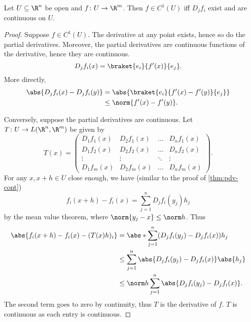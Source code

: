 \begin{proposition}
    Let $U \subseteq \R^n$ be open and $f\colon U \to \R^m$.
    Then $f \in C^1(U)$ iff $D_j f_i$ exist and are continuous on $U$.
\end{proposition}
\begin{proof}
    Suppose $f \in C^1(U)$.
    The derivative at any point exists, hence so do the partial derivatives.
    Moreover, the partial derivatives are continuous functions of the
    derivative, hence they are continuous. \[
        D_j f_i(x) = \braket{e_i}{f'(x)}{e_j}.
    \] More directly, \begin{align*}
        \abs{D_j f_i(x) - D_j f_i(y)}
        &= \abs{\braket{e_i}{f'(x) - f'(y)}{e_j}} \\
        &\le \norm{f'(x) - f'(y)}.
    \end{align*}

    Conversely, suppose the partial derivatives are continuous.
    Let $T\colon U \to L(\R^n, \R^m)$ be given by \[
        T(x) = \begin{pmatrix}
            D_1f_1(x) & D_2f_1(x) & \dots & D_nf_1(x) \\
            D_1f_2(x) & D_2f_2(x) & \dots & D_nf_2(x) \\
            \vdots & \vdots & \ddots & \vdots \\
            D_1f_m(x) & D_2f_m(x) & \dots & D_nf_m(x)
        \end{pmatrix}.
    \]
    For any $x, x+h \in U$ close enough, we have (similar to the proof of
    \cref{thm:pdv-cont}) \[
        f_i(x + h) - f_i(x) = \sum_{j=1}^n D_j f_i(y_j) h_j
    \] by the mean value theorem, where $\norm{y_j - x} \le \norm h$.
    Thus \begin{align*}
        \abs{f_i(x+h) - f_i(x) - (T(x)h)_i}
        &= \abs*{\sum_{j=1}^n (D_j f_i(y_j) - D_j f_i(x)) h_j} \\
        &\le \sum_{j=1}^n \abs{D_j f_i(y_j) - D_j f_i(x)} \abs{h_j} \\
        &\le \norm h \sum_{j=1}^n \abs{D_j f_i(y_j) - D_j f_i(x)}.
    \end{align*} The second term goes to zero by continuity,
    thus $T$ is the derivative of $f$.
    $T$ is continuous as each entry is continuous.
\end{proof}
